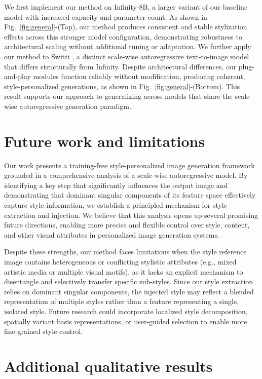 \documentclass[10pt,twocolumn,letterpaper]{article}
\newcommand{\figref}[1]{Fig.~\ref{#1}}
\begin{document}
We first implement our method on Infinity-8B, a larger variant of our baseline model with increased capacity and parameter count. As shown in \figref{fig:general}-(Top), our method produces consistent and stable stylization effects across this stronger model configuration, demonstrating robustness to architectural scaling without additional tuning or adaptation. We further apply our method to Switti \cite{voronov2024switti}, a distinct scale-wise autoregressive text-to-image model that differs structurally from Infinity. Despite architectural differences, our plug-and-play modules function reliably without modification, producing coherent, style-personalized generations, as shown in \figref{fig:general}-(Bottom). This result supports our approach to generalizing across models that share the scale-wise autoregressive generation paradigm.

\section{Future work and limitations}

Our work presents a training-free style-personalized image generation framework grounded in a comprehensive analysis of a scale-wise autoregressive model. By identifying a key step that significantly influences the output image and demonstrating that dominant singular components of its feature space effectively capture style information, we establish a principled mechanism for style extraction and injection. We believe that this analysis opens up several promising future directions, enabling more precise and flexible control over style, content, and other visual attributes in personalized image generation systems.

Despite these strengths, our method faces limitations when the style reference image contains heterogeneous or conflicting stylistic attributes (e.g., mixed artistic media or multiple visual motifs), as it lacks an explicit mechanism to disentangle and selectively transfer specific sub-styles. Since our style extraction relies on dominant singular components, the injected style may reflect a blended representation of multiple styles rather than a feature representing a single, isolated style. Future research could incorporate localized style decomposition, spatially variant basis representations, or user-guided selection to enable more fine-grained style control.


\section{Additional qualitative results}
\end{document}
